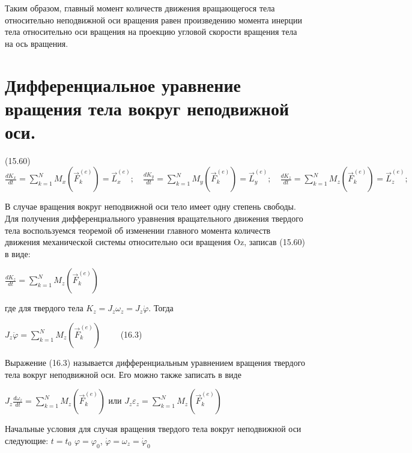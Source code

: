 {\begin{center}
    \par Таким образом, главный момент количеств движения вращающегося тела относительно неподвижной оси вращения равен произведению момента инерции тела относительно оси вращения на проекцию угловой скорости вращения тела на ось вращения.
\end{center}
\section{Дифференциальное уравнение вращения тела вокруг неподвижной оси.}
\begin{center}
  \par{(15.60) \quad ${\frac{dK_x}{dt}} ={\sum\limits_{k=1}^N M_x (\vec{F}_k^{(e)})} = \vec{L}_x^{(e)}; \quad 
  {\frac{dK_y}{dt}} ={\sum\limits_{k=1}^N M_y (\vec{F}_k^{(e)})}= \vec{L}_y^{(e)}; \quad
  {\frac{dK_z}{dt}} ={\sum\limits_{k=1}^N M_z (\vec{F}_k^{(e)})}= \vec{L}_z^{(e)}; \quad$}
  \hfill \break
  \par В случае вращения вокруг неподвижной оси тело имеет одну степень свободы. Для получения дифференциального уравнения вращательного движения твердого тела воспользуемся теоремой об изменении главного момента количеств движения механической системы относительно оси вращения Oz, записав (15.60) в виде:
  \par $ \frac{dK_z}{dt} = \sum_{k=1}^N {M_z} {(\vec{F}_k^{(e)})} $
  \par где для твердого тела $ {K_z} = {J_z} {\omega_z} = {J_z \dot{\varphi} }$. Тогда 
  \par ${J_z}{\ddot{\varphi}} = \sum_{k=1}^N {M_z} {(\vec{F}_k^{(e)})} \qquad$ (16.3)
  \par Выражение (16.3) называется дифференциальным уравнением вращения твердого тела вокруг неподвижной оси. Его можно также записать в виде
  \par ${J_z} \frac{d \omega_z}{dt} = \sum_{k=1}^N {M_z} {(\vec{F}_k^{(e)})}$ или ${J_z}{\varepsilon_z} = \sum_{k=1}^N {M_z} {(\vec{F}_k^{(e)})} $
  \par Начальные условия для случая вращения твердого тела вокруг неподвижной оси следующие: ${t=t_0}$ ${\varphi = \varphi_0}$, ${\dot{\varphi} = {\omega_z} = {\dot{\varphi}_0}}$ 
\end{center}
}
